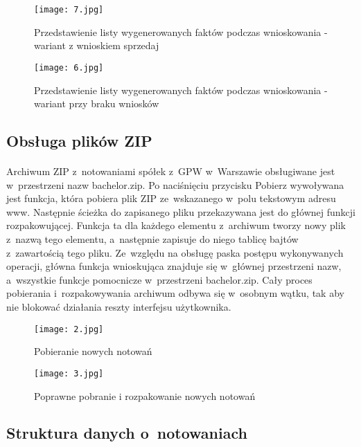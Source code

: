 \begin{figure}[H]
	\centering
	\texttt{[image: 7.jpg]}
	\caption{Przedstawienie listy wygenerowanych faktów podczas wnioskowania - wariant z wnioskiem sprzedaj}
	\label{fig:2}
\end{figure}

\begin{figure}[H]
	\centering
	\texttt{[image: 6.jpg]}
	\caption{Przedstawienie listy wygenerowanych faktów podczas wnioskowania - wariant przy braku wniosków}
	\label{fig:6}
\end{figure}

\subsection{Obsługa plików ZIP}

\paragraph{}
Archiwum ZIP z~notowaniami spółek z~GPW w~Warszawie obsługiwane jest w~przestrzeni nazw bachelor.zip. Po naciśnięciu przycisku Pobierz wywoływana jest funkcja, która pobiera plik ZIP ze~wskazanego w~polu tekstowym adresu www. Następnie ścieżka do zapisanego pliku przekazywana jest do głównej funkcji rozpakowującej. Funkcja ta dla każdego elementu z~archiwum tworzy nowy plik z~nazwą tego elementu, a~następnie zapisuje do niego tablicę bajtów z~zawartością tego pliku. Ze~względu na obsługę paska postępu wykonywanych operacji, główna funkcja wnioskująca znajduje się w~głównej przestrzeni nazw, a~wszystkie funkcje pomocnicze w~przestrzeni bachelor.zip. Cały proces pobierania i~rozpakowywania archiwum odbywa się w~osobnym wątku, tak aby nie blokować działania reszty interfejsu użytkownika.

\begin{figure}[H]
	\centering
	\texttt{[image: 2.jpg]}
	\caption{Pobieranie nowych notowań}
	\label{fig:2}
\end{figure}

\begin{figure}[H]
	\centering
	\texttt{[image: 3.jpg]}
	\caption{Poprawne pobranie i rozpakowanie nowych notowań}
	\label{fig:3}
\end{figure}

\subsection{Struktura danych o~notowaniach}

